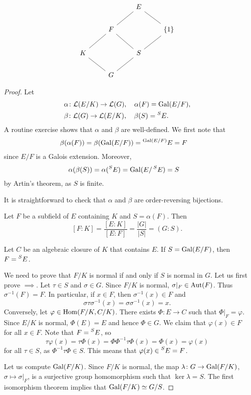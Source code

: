\[
\begin{tikzcd}
	&& E \\
	& F && {\{1\}} \\
	K && S \\
	& G
	\arrow[no head, from=1-3, to=2-2]
	\arrow[no head, from=2-2, to=3-1]
	\arrow[no head, from=3-1, to=4-2]
	\arrow[no head, from=4-2, to=3-3]
	\arrow[no head, from=2-2, to=3-3]
	\arrow[no head, from=1-3, to=2-4]
	\arrow[no head, from=2-4, to=3-3]
\end{tikzcd}
\]

\begin{proof}
Let 
\begin{align*}
&\alpha\colon \mathcal{L}(E/K)\to \mathcal{L}(G),\quad\alpha(F)=\operatorname{Gal}(E/F),\\
&\beta\colon \mathcal{L}(G)\to \mathcal{L}(E/K),\quad\beta(S)=\prescript{S}{}{E}.
\end{align*}
A routine
exercise shows that $\alpha$ and $\beta$ are well-defined. 
We first note that
\begin{align*}
   &\beta(\alpha(F))=\beta(\operatorname{Gal}(E/F))=\prescript{\operatorname{Gal}(E/F)}{}{E}=F
\end{align*}
since $E/F$ is a Galois extension. Moreover,
\begin{align*}
   &\alpha(\beta(S))=\alpha(\prescript{S}{}{E})=\operatorname{Gal}(E/\prescript{S}{}{E})=S
\end{align*}
by Artin's theorem, as $S$ is finite. 

It is straightforward to check that $\alpha$ and $\beta$ are order-reversing bijections. 

Let $F$ be a subfield of $E$ containing $K$ and 
$S=\alpha(F)$. Then
\[
[F:K]=\frac{[E:K]}{[E:F]}=\frac{|G|}{|S|}=(G:S).
\]

Let $C$ be an algebraic closure of $K$ that contains $E$. 
If $S=\operatorname{Gal}(E/F)$, then $F=\prescript{S}{}{E}$. 

We need to prove that $F/K$ is normal if and only if $S$ is normal in $G$. 
Let us first prove $\implies$. Let $\tau\in S$ and $\sigma\in G$. Since
$F/K$ is normal, $\sigma|_F\in\operatorname{Aut}(F)$. Thus $\sigma^{-1}(F)=F$. In particular, 
if $x\in F$, then $\sigma^{-1}(x)\in F$ and 
\[
\sigma\tau\sigma^{-1}(x)=\sigma\sigma^{-1}(x)=x.
\]
Conversely, let $\varphi\in\operatorname{Hom}(F/K,C/K)$. There exists 
$\Phi\colon E\to C$ such that $\Phi|_F=\varphi$. Since $E/K$ is normal, 
$\Phi(E)=E$ and hence $\Phi\in G$. We claim that $\varphi(x)\in F$ for all $x\in F$. 
Note that $F=\prescript{S}{}{E}$, so
 \[
 \tau\varphi(x)=\tau\Phi(x)=\Phi\Phi^{-1}\tau\Phi(x)=\Phi(x)=\varphi(x)
 \]
 for all $\tau\in S$, as $\Phi^{-1}\tau\Phi\in S$. This means that $\varphi(x)\in\prescript{S}{}{E}=F$. 
 
 Let us compute $\operatorname{Gal}(F/K)$. Since $F/K$ is normal, 
 the map 
 $\lambda\colon G\to\operatorname{Gal}(F/K)$, $\sigma\mapsto\sigma|_F$, 
 is a surjective group homomorphism such that $\ker\lambda=S$. The first isomorphism 
 theorem implies that $\operatorname{Gal}(F/K)\simeq G/S$. 
\end{proof}

